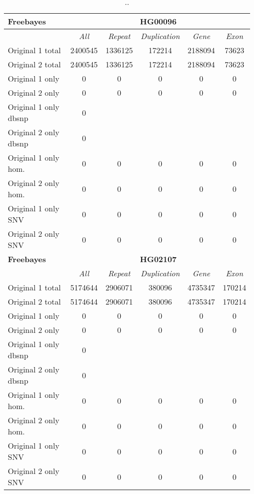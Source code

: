 \begin{table}[htb]
\begin{center}
\begin{tabular}{|l|c||c|c|c|c|}
\hline
{\bf Freebayes} & \multicolumn{5}{|c|}{\bf HG00096} \\
\hline
\cline{2-6}
{\bf} & {\it All} & {\it Repeat} & {\it Duplication} & {\it Gene} & {\it Exon} \\
\hline
Original 1 total & 2400545 & 1336125 & 172214 & 2188094 & 73623\\ 
\hline
Original 2 total & 2400545 & 1336125 & 172214 & 2188094 & 73623\\ 
\hline
Original 1 only & 0 & 0 & 0 & 0 & 0\\ 
\hline
Original 2 only & 0 & 0 & 0 & 0 & 0\\ 
\hline
Original 1 only dbsnp & 0 &  &  &  & \\ 
\hline
Original 2 only dbsnp & 0 &  &  &  & \\ 
\hline
Original 1 only hom. & 0 & 0 & 0 & 0 & 0\\ 
\hline
Original 2 only hom. & 0 & 0 & 0 & 0 & 0\\ 
\hline
Original 1 only SNV & 0 & 0 & 0 & 0 & 0\\ 
\hline
Original 2 only SNV & 0 & 0 & 0 & 0 & 0\\ 
\hline
\hline
{\bf Freebayes} & \multicolumn{5}{|c|}{\bf HG02107} \\
\hline
\cline{2-6}
{\bf} & {\it All} & {\it Repeat} & {\it Duplication} & {\it Gene} & {\it Exon} \\
\hline
Original 1 total & 5174644 & 2906071 & 380096 & 4735347 & 170214\\ 
\hline
Original 2 total & 5174644 & 2906071 & 380096 & 4735347 & 170214\\ 
\hline
Original 1 only & 0 & 0 & 0 & 0 & 0\\ 
\hline
Original 2 only & 0 & 0 & 0 & 0 & 0\\ 
\hline
Original 1 only dbsnp & 0 &  &  &  & \\ 
\hline
Original 2 only dbsnp & 0 &  &  &  & \\ 
\hline
Original 1 only hom. & 0 & 0 & 0 & 0 & 0\\ 
\hline
Original 2 only hom. & 0 & 0 & 0 & 0 & 0\\ 
\hline
Original 1 only SNV & 0 & 0 & 0 & 0 & 0\\ 
\hline
Original 2 only SNV & 0 & 0 & 0 & 0 & 0\\ 
\hline
\end{tabular}
\end{center}
\caption{ .. }
\label{tab:orig-vs-orig2-freebayes}
\end{table}

